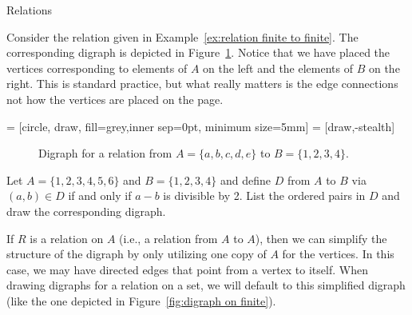 \begin{section}{Relations}
\begin{example}
Consider the relation given in Example~\ref{ex:relation finite to finite}.  The corresponding digraph is depicted in Figure~\ref{fig:digraph finite to finite}. Notice that we have placed the vertices corresponding to elements of $A$ on the left and the elements of $B$ on the right.  This is standard practice, but what really matters is the edge connections not how the vertices are placed on the page.
\end{example}

 = [circle, draw, fill=grey,inner sep=0pt, minimum size=5mm]
 = [draw,-stealth]

\begin{figure}[h!]
\begin{center}
\caption{Digraph for a relation from $A=\{a,b,c,d,e\}$ to $B=\{1,2,3,4\}$.}\label{fig:digraph finite to finite}
\end{center}
\end{figure}

\begin{problem}
Let $A=\{1,2,3,4,5,6\}$ and $B=\{1,2,3,4\}$ and define $D$ from $A$ to $B$ via $(a,b)\in D$ if and only if $a-b$ is divisible by 2.  List the ordered pairs in $D$ and draw the corresponding digraph.
\end{problem}

If $R$ is a relation on $A$ (i.e., a relation from $A$ to $A$), then we can simplify the structure of the digraph by only utilizing one copy of $A$ for the vertices. In this case, we may have directed edges that point from a vertex to itself.  When drawing digraphs for a relation on a set, we will default to this simplified digraph (like the one depicted in Figure~\ref{fig:digraph on finite}).


\end{section}
